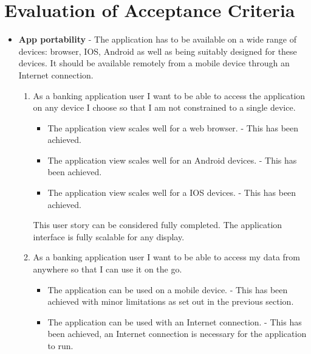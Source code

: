 \section{Evaluation of Acceptance Criteria}
\begin{itemize}
\item \textbf{App portability} - The application has to be available on a wide range of devices: browser, IOS, Android as well as being suitably designed for these devices. It should be available remotely from a mobile device through an Internet connection.
        \begin{enumerate}
        \item As a banking application user I want to be able to access the application on any device I choose so that I am not constrained to a single device.
        \begin{itemize}
                \item The application view scales well for a web browser. - This has been achieved.
                \item The application view scales well for an Android devices. - This has been achieved.
                \item The application view scales well for a IOS devices. - This has been achieved.
            \end{itemize}
            This user story can be considered fully completed. The application interface is fully scalable for any display. 
        \item As a banking application user I want to be able to access my data from anywhere so that I can use it on the go.
            \begin{itemize}
                \item The application can be used on a mobile device. - This has been achieved with minor limitations as set out in the previous section.
                \item The application can be used with an Internet connection. - This has been achieved, an Internet connection is necessary for the application to run.


\end{itemize}
\end{enumerate}
\end{itemize}
